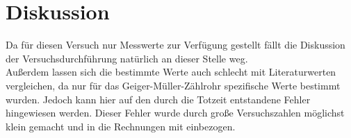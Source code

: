 \section{Diskussion}
Da für diesen Versuch nur Messwerte zur Verfügung gestellt fällt die Diskussion der Versuchsdurchführung natürlich an dieser Stelle weg.\\
Außerdem lassen sich die bestimmte Werte auch schlecht mit Literaturwerten vergleichen, da nur für das Geiger-Müller-Zählrohr spezifische Werte bestimmt wurden.
Jedoch kann hier auf den durch die Totzeit entstandene Fehler hingewiesen werden. 
Dieser Fehler wurde durch große Versuchszahlen möglichst klein gemacht und in die Rechnungen mit einbezogen.
